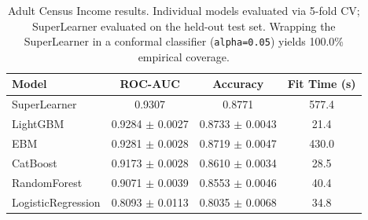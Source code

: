 \begin{table}[t]
\centering
\caption{Adult Census Income results. Individual models evaluated via 5-fold CV; SuperLearner evaluated on the held-out test set. Wrapping the SuperLearner in a conformal classifier (\texttt{alpha=0.05}) yields 100.0\% empirical coverage.}
\label{tab:adult}
\small
\begin{tabular}{@{}lccc@{}}
\toprule
\textbf{Model} & \textbf{ROC-AUC} & \textbf{Accuracy} & \textbf{Fit Time (s)} \\
\midrule
SuperLearner & 0.9307 & 0.8771 & 577.4 \\
LightGBM & 0.9284 $\pm$ 0.0027 & 0.8733 $\pm$ 0.0043 & 21.4 \\
EBM & 0.9281 $\pm$ 0.0028 & 0.8719 $\pm$ 0.0047 & 430.0 \\
CatBoost & 0.9173 $\pm$ 0.0028 & 0.8610 $\pm$ 0.0034 & 28.5 \\
RandomForest & 0.9071 $\pm$ 0.0039 & 0.8553 $\pm$ 0.0046 & 40.4 \\
LogisticRegression & 0.8093 $\pm$ 0.0113 & 0.8035 $\pm$ 0.0068 & 34.8 \\
\bottomrule
\end{tabular}
\end{table}